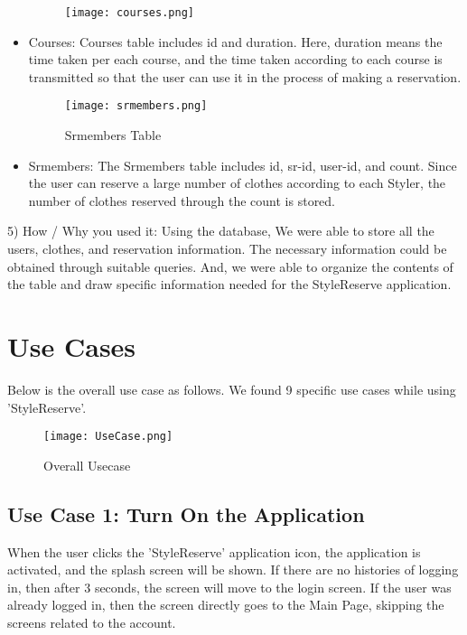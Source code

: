\documentclass[conference]{IEEEtran}
\begin{document}
\begin{itemize}
    \begin{figure}[htbp]
    \centerline{\texttt{[image: courses.png]}}
    \label{fig}
    \end{figure}
    \item Courses: Courses table includes id and duration. Here, duration means the time taken per each course, and the time taken according to each course is transmitted so that the user can use it in the process of making a reservation.\\
    
    \begin{figure}[htbp]
    \centerline{\texttt{[image: srmembers.png]}}
    \label{fig}
    \caption{Srmembers Table}
    \end{figure}
    \item Srmembers: The Srmembers table includes id, sr-id, user-id, and count. Since the user can reserve a large number of clothes according to each Styler, the number of clothes reserved through the count is stored.\\
\end{itemize}

5) How / Why you used it: Using the database, We were able to store all the users, clothes, and reservation information. The necessary information could be obtained through suitable queries. And, we were able to organize the contents of the table and draw specific information needed for the StyleReserve application.\\

\section{Use Cases}
Below is the overall use case as follows. We found 9 specific use cases while using 'StyleReserve'.\\

\newpage
\begin{figure}[htbp]
\centerline{\texttt{[image: UseCase.png]}}
\label{fig}
\caption{Overall Usecase}
\end{figure}

\subsection{Use Case 1: Turn On the Application}
When the user clicks the 'StyleReserve' application icon, the application is activated, and the splash screen will be shown. If there are no histories of logging in, then after 3 seconds, the screen will move to the login screen. If the user was already logged in, then the screen directly goes to the Main Page, skipping the screens related to the account.\\
    
\end{document}

